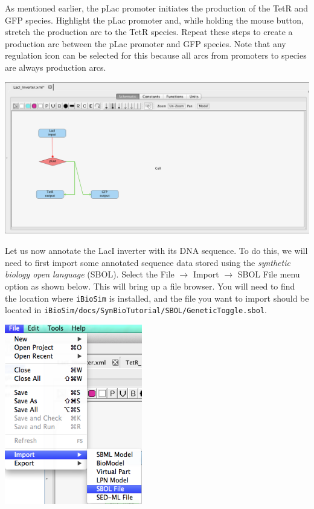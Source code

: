 \documentclass[titlepage,11pt]{article}
\begin{document}
As mentioned earlier, the pLac promoter initiates the production of the TetR and GFP species.  Highlight the pLac promoter and, while holding the mouse button, stretch the production arc to the TetR species.  Repeat these steps to create a production arc between the pLac promoter and GFP species.  Note that any regulation icon can be selected for this because all arcs from promoters to species are always production arcs.  

\begin{center}
\includegraphics[width=160mm]{screenshots/productionGT}
\end{center}

Let us now annotate the LacI inverter with its DNA sequence.  To do this, we will need to first import some annotated sequence data stored using the \emph{synthetic biology open language} (SBOL).  Select the File $\rightarrow$ Import $\rightarrow$ SBOL File menu option as shown below.  This will bring up a file browser.  You will need to find the location where {\tt iBioSim} is installed, and the file you want to import should be located in {\tt iBioSim/docs/SynBioTutorial/SBOL/GeneticToggle.sbol}.  

\begin{center}
\includegraphics[width=60mm]{screenshots/importSBOL}
\end{center}
\end{document}
